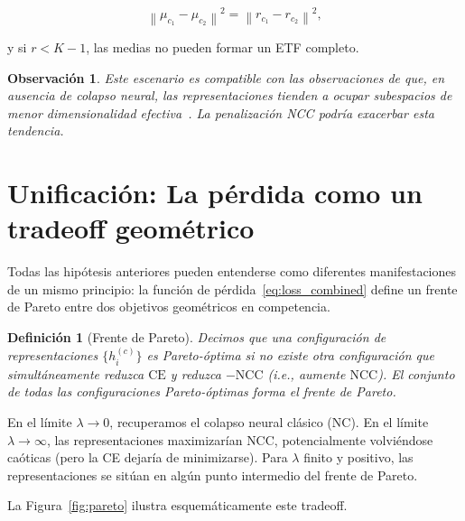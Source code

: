 \documentclass[12pt,a4paper]{report}
\newtheorem{definition}{Definición}[chapter]
\newtheorem{remark}{Observación}[chapter]
\newcommand{\norm}[1]{\left\lVert#1\right\rVert}
\newcommand{\NCC}{\text{NCC}}
\newcommand{\CE}{\text{CE}}
\begin{document}
\begin{equation}
    \norm{\mu_{c_1} - \mu_{c_2}}^2 = \norm{r_{c_1} - r_{c_2}}^2,
\end{equation}

y si $r < K-1$, las medias no pueden formar un ETF completo.

\begin{remark}
Este escenario es compatible con las observaciones de que, en ausencia de colapso neural, las representaciones tienden a ocupar subespacios de menor dimensionalidad efectiva~\cite{papyan2020prevalence, zhu2021geometric}. La penalización NCC podría exacerbar esta tendencia.
\end{remark}

\section{Unificación: La pérdida como un tradeoff geométrico}

Todas las hipótesis anteriores pueden entenderse como diferentes manifestaciones de un mismo principio: la función de pérdida~\eqref{eq:loss_combined} define un frente de Pareto entre dos objetivos geométricos en competencia.

\begin{definition}[Frente de Pareto]
Decimos que una configuración de representaciones $\{h_i^{(c)}\}$ es Pareto-óptima si no existe otra configuración que simultáneamente reduzca $\CE$ y reduzca $-\NCC$ (i.e., aumente $\NCC$). El conjunto de todas las configuraciones Pareto-óptimas forma el \emph{frente de Pareto}.
\end{definition}

En el límite $\lambda \to 0$, recuperamos el colapso neural clásico (NC). En el límite $\lambda \to \infty$, las representaciones maximizarían $\NCC$, potencialmente volviéndose caóticas (pero la CE dejaría de minimizarse). Para $\lambda$ finito y positivo, las representaciones se sitúan en algún punto intermedio del frente de Pareto.

La Figura~\ref{fig:pareto} ilustra esquemáticamente este tradeoff.
\end{document}
